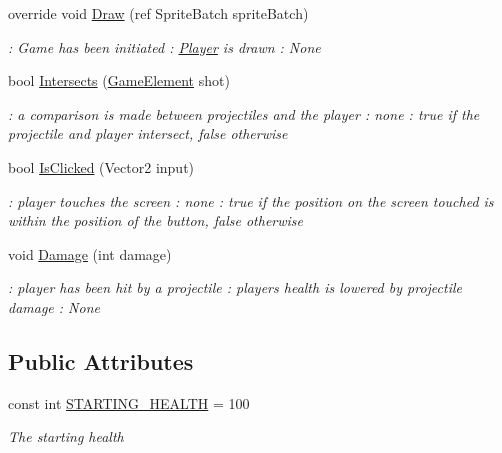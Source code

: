 \begin{DoxyCompactItemize}
override void \hyperlink{classXaria_1_1Player_a25ddea2b9d8679ab6aa649fda6ce1f22}{Draw} (ref Sprite\+Batch sprite\+Batch)
\begin{DoxyCompactList}\small\item\em \+: Game has been initiated \+: \hyperlink{classXaria_1_1Player}{Player} is drawn \+: None \end{DoxyCompactList}\item 
bool \hyperlink{classXaria_1_1Player_a9f8353151c84bf23a7fd646ffdefb852}{Intersects} (\hyperlink{classXaria_1_1GameElement}{Game\+Element} shot)
\begin{DoxyCompactList}\small\item\em \+: a comparison is made between projectiles and the player \+: none \+: true if the projectile and player intersect, false otherwise \end{DoxyCompactList}\item 
bool \hyperlink{classXaria_1_1Player_a24728ed29589e0601a9a0c9752f8e4bd}{Is\+Clicked} (Vector2 input)
\begin{DoxyCompactList}\small\item\em \+: player touches the screen \+: none \+: true if the position on the screen touched is within the position of the button, false otherwise \end{DoxyCompactList}\item 
void \hyperlink{classXaria_1_1Player_aefc8537a0f978f3cc5f490d1fccefd56}{Damage} (int damage)
\begin{DoxyCompactList}\small\item\em \+: player has been hit by a projectile \+: player\textquotesingle{}s health is lowered by projectile damage \+: None \end{DoxyCompactList}\end{DoxyCompactItemize}
\subsection*{Public Attributes}
\begin{DoxyCompactItemize}
\item 
const int \hyperlink{classXaria_1_1Player_a454099110fca2d19ae08bc7174802018}{S\+T\+A\+R\+T\+I\+N\+G\+\_\+\+H\+E\+A\+L\+TH} = 100
\begin{DoxyCompactList}\small\item\em The starting health \end{DoxyCompactList}\end{DoxyCompactItemize}
